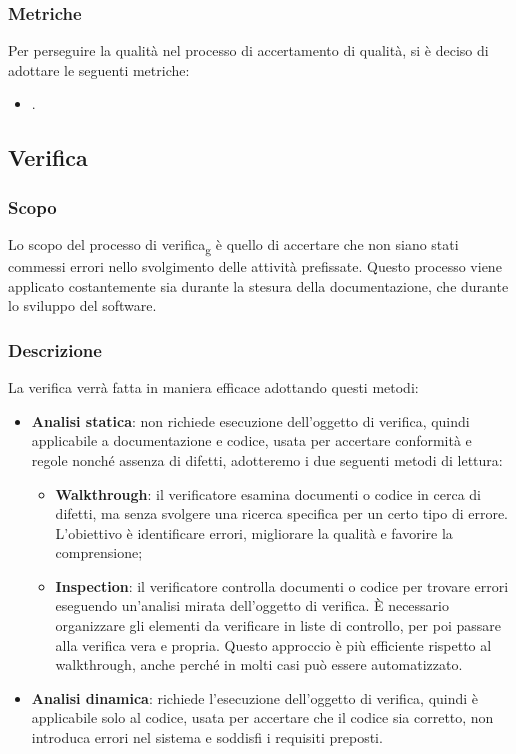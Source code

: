 \subsubsection{Metriche}
Per perseguire la qualità nel processo di accertamento di qualità, si è deciso
di adottare le seguenti metriche:
\begin{itemize}
      \item {}.
\end{itemize}
\subsection{Verifica}
\subsubsection{Scopo}
Lo scopo del processo di verifica\textsubscript{g} è quello di accertare che
non siano stati commessi errori nello svolgimento delle attività prefissate.
Questo processo viene applicato costantemente sia durante la stesura della
documentazione, che durante lo sviluppo del software.
\subsubsection{Descrizione}
La verifica verrà fatta in maniera efficace adottando questi metodi:
\begin{itemize}
      \item \textbf{Analisi statica}: non richiede esecuzione dell'oggetto di verifica, quindi applicabile a documentazione e codice, usata per accertare conformità e regole nonché assenza di difetti, adotteremo i due seguenti metodi di lettura:
            \begin{itemize}
                  \item \textbf{Walkthrough}: il verificatore esamina documenti o codice in cerca di difetti, ma senza svolgere una
                        ricerca specifica per un certo tipo di errore. L'obiettivo è identificare errori, migliorare la qualità e favorire la comprensione;
                  \item \textbf{Inspection}: il verificatore controlla documenti o codice per trovare errori
                        eseguendo un'analisi mirata dell'oggetto di verifica. È necessario organizzare gli elementi da verificare in liste di controllo,
                        per poi passare alla verifica vera e propria. Questo approccio è più efficiente rispetto al walkthrough, 
                        anche perché in molti casi può essere automatizzato.
            \end{itemize}
      \item \textbf{Analisi dinamica}: richiede l'esecuzione dell'oggetto di verifica, quindi è applicabile solo al codice, usata per accertare che il codice sia corretto, non introduca errori nel sistema e soddisfi i requisiti preposti.
\end{itemize}
